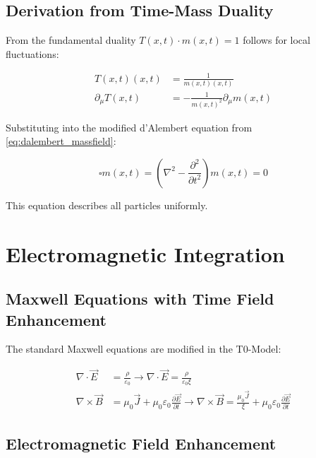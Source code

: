 \documentclass[12pt,a4paper]{report}
\newcommand{\Tfield}{T(x,t)}  %
\newcommand{\mfield}{m(x,t)}  %
\newcommand{\xipar}{\xi}      %
\begin{document}
	\subsection{Derivation from Time-Mass Duality}\label{subsec:derivation_wave_equation}
	
	From the fundamental duality $\Tfield \cdot \mfield = 1$ follows for local fluctuations:
	
	\begin{align}
		\Tfield(x,t) &= \frac{1}{\mfield(x,t)} \\
		\partial_\mu \Tfield &= -\frac{1}{\mfield^2} \partial_\mu \mfield
	\end{align}
	
	Substituting into the modified d'Alembert equation from \autoref{eq:dalembert_massfield}:
	
	\begin{equation}\label{eq:universal_wave_equation}
		\square \mfield = \left(\nabla^2 - \frac{\partial^2}{\partial t^2}\right) \mfield = 0
	\end{equation}
	
	This equation describes all particles uniformly.
	
	\section{Electromagnetic Integration}\label{sec:electromagnetic_integration}
	
	\subsection{Maxwell Equations with Time Field Enhancement}\label{subsec:maxwell_timefield}
	
	The standard Maxwell equations are modified in the T0-Model:
	
	\begin{align}
		\nabla \cdot \vec{E} &= \frac{\rho}{\varepsilon_0} \rightarrow \nabla \cdot \vec{E} = \frac{\rho}{\varepsilon_0 \xipar} \\
		\nabla \times \vec{B} &= \mu_0 \vec{J} + \mu_0 \varepsilon_0 \frac{\partial \vec{E}}{\partial t} \rightarrow \nabla \times \vec{B} = \frac{\mu_0 \vec{J}}{\xipar} + \mu_0 \varepsilon_0 \frac{\partial \vec{E}}{\partial t}
	\end{align}
	
	\subsection{Electromagnetic Field Enhancement}\label{subsec:em_field_enhancement}
	
\end{document}
